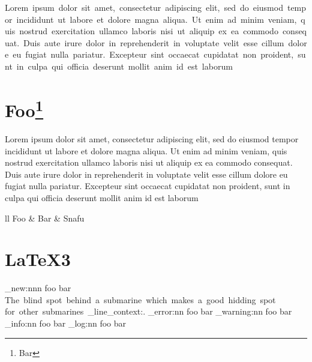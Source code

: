 \documentclass{article}
\begin{document}
  \begin{center}
    \hbox{Lorem ipsum dolor sit amet, consectetur adipiscing elit, sed do eiusmod tempor incididunt ut labore et dolore magna aliqua. Ut enim ad minim
    veniam, quis nostrud exercitation ullamco laboris nisi ut aliquip ex ea commodo consequat. Duis aute irure dolor in reprehenderit in voluptate
    velit esse cillum dolore eu fugiat nulla pariatur. Excepteur sint occaecat cupidatat non proident, sunt in culpa qui officia deserunt mollit anim
    id est laborum} \\
  \end{center}

  \section{Foo\footnote{Bar}}

  Lorem ipsum dolor sit amet, consectetur adipiscing elit, sed do eiusmod tempor incididunt ut labore et dolore magna aliqua. Ut enim ad minim
  veniam, quis nostrud exercitation ullamco laboris nisi ut aliquip ex ea commodo consequat. Duis aute irure dolor in reprehenderit in voluptate
  velit esse cillum dolore eu fugiat nulla pariatur. Excepteur sint occaecat cupidatat non proident, sunt in culpa qui officia deserunt mollit anim
  id est laborum

  \begin{tabular}{ll}
    Foo & Bar & Snafu \\
  \end{tabular}


  \PackageError{bar}{Significant package issue}{RTFM!}

  \section{\LaTeX3}

  \ExplSyntaxOn
  \msg_new:nnn {foo} {bar} {
    The~blind~spot~behind~a~submarine~which~makes~a~good~hidding~spot~
    for~other~submarines~\msg_line_context:.}
  \msg_error:nn {foo} {bar}
  \msg_warning:nn {foo} {bar}
  \msg_info:nn {foo} {bar}
  \msg_log:nn {foo} {bar}
  \ExplSyntaxOff

  
\end{document}
